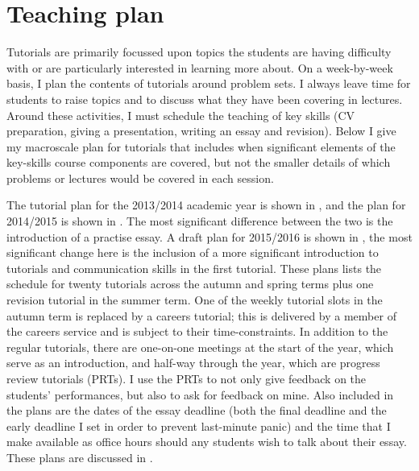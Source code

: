 \chapter{Teaching plan}\label{ap:plan}

Tutorials are primarily focussed upon topics the students are having difficulty with or are particularly interested in learning more about. On a week-by-week basis, I plan the contents of tutorials around problem sets. I always leave time for students to raise topics and to discuss what they have been covering in lectures. Around these activities, I must schedule the teaching of key skills (CV preparation, giving a presentation, writing an essay and revision). Below I give my macroscale plan for tutorials that includes when significant elements of the key-skills course components are covered, but not the smaller details of which problems or lectures would be covered in each session.

The tutorial plan for the 2013/2014 academic year is shown in , and the plan for 2014/2015 is shown in . The most significant difference between the two is the introduction of a practise essay. A draft plan for 2015/2016 is shown in , the most significant change here is the inclusion of a more significant introduction to tutorials and communication skills in the first tutorial. These plans lists the schedule for twenty tutorials across the autumn and spring terms plus one revision tutorial in the summer term. One of the weekly tutorial slots in the autumn term is replaced by a careers tutorial; this is delivered by a member of the careers service and is subject to their time-constraints. In addition to the regular tutorials, there are one-on-one meetings at the start of the year, which serve as an introduction, and half-way through the year, which are progress review tutorials (PRTs). I use the PRTs to not only give feedback on the students' performances, but also to ask for feedback on mine. Also included in the plans are the dates of the essay deadline (both the final deadline and the early deadline I set in order to prevent last-minute panic) and the time that I make available as office hours should any students wish to talk about their essay. These plans are discussed in .


